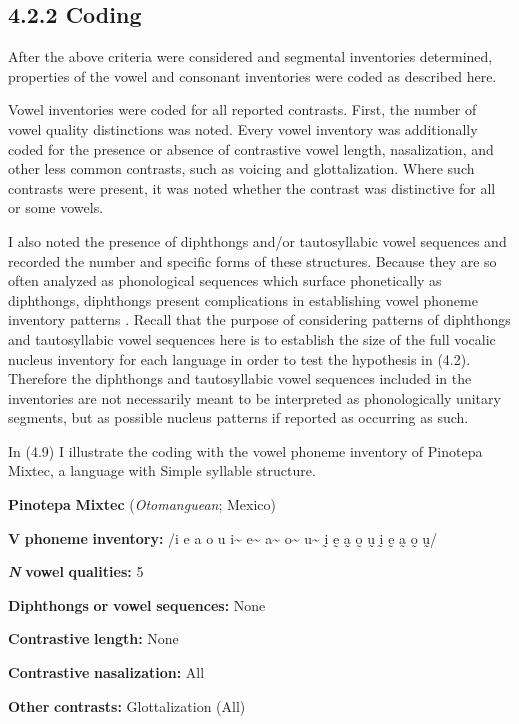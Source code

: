\subsection{4.2.2 Coding}

  After the above criteria were considered and segmental inventories determined, properties of the vowel and consonant inventories were coded as described here.

  Vowel inventories were coded for all reported contrasts. First, the number of vowel quality distinctions was noted. Every vowel inventory was additionally coded for the presence or absence of contrastive vowel length, nasalization, and other less common contrasts, such as voicing and glottalization. Where such contrasts were present, it was noted whether the contrast was distinctive for all or some vowels. 

  I also noted the presence of diphthongs and/or tautosyllabic vowel sequences and recorded the number and specific forms of these structures. Because they are so often analyzed as phonological sequences which surface phonetically as diphthongs, diphthongs present complications in establishing vowel phoneme inventory patterns \citep[133]{Maddieson1984}. Recall that the purpose of considering patterns of diphthongs and tautosyllabic vowel sequences here is to establish the size of the full vocalic nucleus inventory for each language in order to test the hypothesis in (4.2). Therefore the diphthongs and tautosyllabic vowel sequences included in the inventories are not necessarily meant to be interpreted as phonologically unitary segments, but as possible nucleus patterns if reported as occurring as such.

  In (4.9) I illustrate the coding with the vowel phoneme inventory of Pinotepa Mixtec, a language with Simple syllable structure.

\ea\label{ex:(4.9)}
   \textbf{Pinotepa} \textbf{Mixtec} (\textit{Otomanguean}; Mexico)

\textbf{V} \textbf{phoneme} \textbf{inventory:} /i e a o u i\~{}  e\~{}  a\~{}  o\~{}  u\~{}  ḭ ḛ a̰ o̰ ṵ ḭ ḛ a̰ o̰ ṵ/

\textbf{\textit{N}} \textbf{vowel} \textbf{qualities:} 5

\textbf{Diphthongs} \textbf{or} \textbf{vowel} \textbf{sequences:} None

\textbf{Contrastive} \textbf{length:} None

\textbf{Contrastive} \textbf{nasalization:} All

\textbf{Other} \textbf{contrasts:} Glottalization (All)
\z

